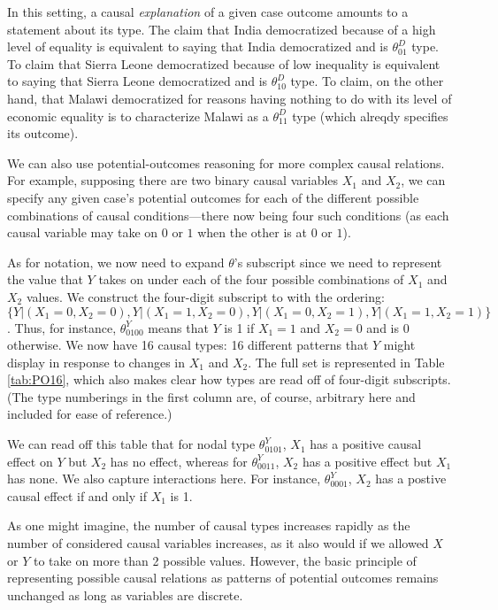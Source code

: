 \documentclass[12pt,]{book}
\begin{document}
In this setting, a causal \emph{explanation} of a given case outcome amounts to a statement about its type. The claim that India democratized because of a high level of equality is equivalent to saying that India democratized and is \(\theta^D_{01}\) type. To claim that Sierra Leone democratized because of low inequality is equivalent to saying that Sierra Leone democratized and is \(\theta^D_{10}\) type. To claim, on the other hand, that Malawi democratized for reasons having nothing to do with its level of economic equality is to characterize Malawi as a \(\theta^D_{11}\) type (which alreqdy specifies its outcome).

We can also use potential-outcomes reasoning for more complex causal relations. For example, supposing there are two binary causal variables \(X_1\) and \(X_2\), we can specify any given case's potential outcomes for each of the different possible combinations of causal conditions---there now being four such conditions (as each causal variable may take on \(0\) or \(1\) when the other is at \(0\) or \(1\)).

As for notation, we now need to expand \(\theta\)'s subscript since we need to represent the value that \(Y\) takes on under each of the four possible combinations of \(X_1\) and \(X_2\) values. We construct the four-digit subscript to with the ordering: \[\{Y|(X_1=0, X_2=0),Y|(X_1=1, X_2=0),Y|(X_1=0, X_2=1),Y|(X_1=1, X_2=1)\}\].
Thus, for instance, \(\theta^Y_{0100}\) means that \(Y\) is 1 if \(X_1=1\) and \(X_2=0\) and is 0 otherwise. We now have 16 causal types: 16 different patterns that \(Y\) might display in response to changes in \(X_1\) and \(X_2\). The full set is represented in Table \ref{tab:PO16}, which also makes clear how types are read off of four-digit subscripts. (The type numberings in the first column are, of course, arbitrary here and included for ease of reference.)

We can read off this table that for nodal type \(\theta^Y_{0101}\), \(X_1\) has a positive causal effect on \(Y\) but \(X_2\) has no effect, whereas for \(\theta^Y_{0011}\), \(X_2\) has a positive effect but \(X_1\) has none. We also capture interactions here. For instance, \(\theta^Y_{0001}\), \(X_2\) has a postive causal effect if and only if \(X_1\) is 1.

As one might imagine, the number of causal types increases rapidly as the number of considered causal variables increases, as it also would if we allowed \(X\) or \(Y\) to take on more than 2 possible values. However, the basic principle of representing possible causal relations as patterns of potential outcomes remains unchanged as long as variables are discrete.
\end{document}
